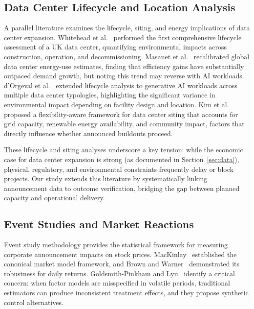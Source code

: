 \documentclass[5p,12pt]{elsarticle}
\begin{document}
\subsection{Data Center Lifecycle and Location Analysis}

A parallel literature examines the lifecycle, siting, and energy implications of data center expansion. Whitehead et al.~\cite{Whitehead2015Lifecycle} performed the first comprehensive lifecycle assessment of a UK data center, quantifying environmental impacts across construction, operation, and decommissioning. Masanet et al.~\cite{Masanet2020Global} recalibrated global data center energy-use estimates, finding that efficiency gains have substantially outpaced demand growth, but noting this trend may reverse with AI workloads. d'Orgeval et al.~\cite{dOrgeval2026Generative} extended lifecycle analysis to generative AI workloads across multiple data center typologies, highlighting the significant variance in environmental impact depending on facility design and location. Kim et al.~\cite{Kim2026Flexibility} proposed a flexibility-aware framework for data center siting that accounts for grid capacity, renewable energy availability, and community impact, factors that directly influence whether announced buildouts proceed.

These lifecycle and siting analyses underscore a key tension: while the economic case for data center expansion is strong (as documented in Section~\ref{sec:data}), physical, regulatory, and environmental constraints frequently delay or block projects. Our study extends this literature by systematically linking announcement data to outcome verification, bridging the gap between planned capacity and operational delivery.

\subsection{Event Studies and Market Reactions}

Event study methodology provides the statistical framework for measuring corporate announcement impacts on stock prices. MacKinlay~\cite{MacKinlay1997Event} established the canonical market model framework, and Brown and Warner~\cite{Brown1985Daily} demonstrated its robustness for daily returns. Goldsmith-Pinkham and Lyu~\cite{GoldsmithPinkham2025Financial} identify a critical concern: when factor models are misspecified in volatile periods, traditional estimators can produce inconsistent treatment effects, and they propose synthetic control alternatives.
\end{document}
